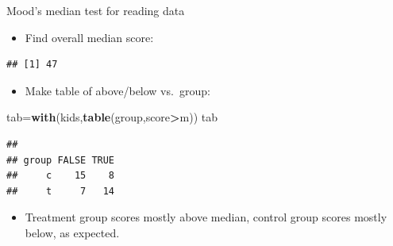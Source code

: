 \documentclass[
  ignorenonframetext,
]{beamer}
\newenvironment{Shaded}{\begin{snugshade}}{\end{snugshade}}
\newcommand{\DataTypeTok}[1]{\textcolor[rgb]{0.13,0.29,0.53}{#1}}
\newcommand{\KeywordTok}[1]{\textcolor[rgb]{0.13,0.29,0.53}{\textbf{#1}}}
\newcommand{\NormalTok}[1]{#1}
\newcommand{\OperatorTok}[1]{\textcolor[rgb]{0.81,0.36,0.00}{\textbf{#1}}}
\newcommand{\StringTok}[1]{\textcolor[rgb]{0.31,0.60,0.02}{#1}}
\providecommand{\tightlist}{%
  \setlength{\itemsep}{0pt}\setlength{\parskip}{0pt}}
\begin{document}
\begin{frame}[fragile]{Mood's median test for reading data}
\protect\hypertarget{moods-median-test-for-reading-data}{}

\begin{itemize}
\tightlist
\item
  Find overall median score:
\end{itemize}

\begin{Shaded}
\end{Shaded}

\begin{verbatim}
## [1] 47
\end{verbatim}

\begin{itemize}
\tightlist
\item
  Make table of above/below vs.~group:
\end{itemize}

\begin{Shaded}
\begin{Highlighting}[]
\NormalTok{tab=}\KeywordTok{with}\NormalTok{(kids,}\KeywordTok{table}\NormalTok{(group,score}\OperatorTok{>}\NormalTok{m))}
\NormalTok{tab}
\end{Highlighting}
\end{Shaded}

\begin{verbatim}
##      
## group FALSE TRUE
##     c    15    8
##     t     7   14
\end{verbatim}

\begin{itemize}
\tightlist
\item
  Treatment group scores mostly above median, control group scores
  mostly below, as expected.
\end{itemize}

\end{frame}
\end{document}
